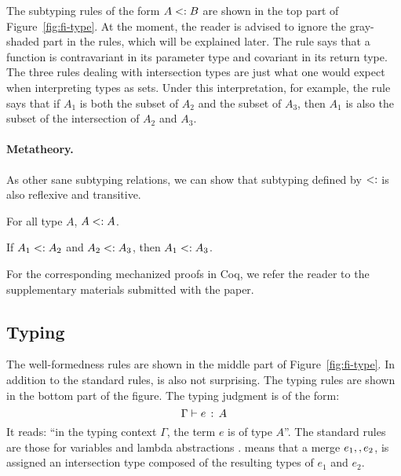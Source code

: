 The subtyping rules of the form $A <: B$ are shown in the top part of
Figure~\ref{fig:fi-type}. At the moment, the reader is advised to ignore the
gray-shaded part in the rules, which will be explained later. The rule
 says that a function is contravariant in its parameter
type and covariant in its return type. The three rules dealing with
intersection types are just what one would expect when interpreting types as
sets. Under this interpretation, for example, the rule 
says that if $A_1$ is both the subset of $A_2$ and the subset of $A_3$, then
$A_1$ is also the subset of the intersection of $A_2$ and $A_3$.

\paragraph{Metatheory.} As other sane subtyping relations, we can show that
subtyping defined by $<:$ is also reflexive and transitive.

\begin{lemma} \label{lemma:sub-refl}
  For all type $ A $, $ A <: A $.
\end{lemma}

\begin{lemma} \label{lemma:sub-trans}
  If $ A_1 <: A_2 $ and $ A_2 <: A_3 $,
  then $ A_1 <: A_3 $.
\end{lemma}

For the corresponding mechanized proofs in Coq, we refer the reader to the
supplementary materials submitted with the paper.

\subsection{Typing}

The well-formedness rules are shown in the middle part of
Figure~\ref{fig:fi-type}. In addition to the standard rules,
 is also not surprising. The typing rules are shown in
the bottom part of the figure. The typing judgment is of the form:
\[ \Gamma \vdash e \ \!:\! \ A \]
It reads: ``in the typing context $\Gamma$, the term $e$ is of type
$A$''. The standard rules are those for variables
 and lambda abstractions
.  means that a merge
$e_1 ,, e_2$, is assigned an intersection type composed of the
resulting types of $e_1$ and $e_2$.

